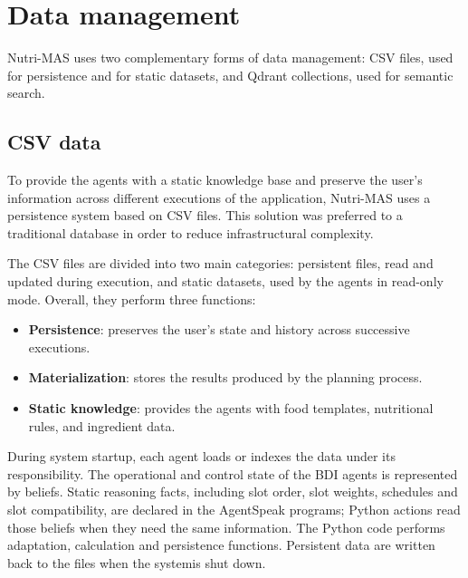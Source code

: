 \documentclass[12pt,a4paper]{article}
\begin{document}
\section{Data management}

Nutri-MAS uses two complementary forms of data management: CSV files,
used for persistence and for static datasets, and Qdrant collections,
used for semantic search.

\subsection{CSV data}

To provide the agents with a static knowledge base and preserve the
user's information across different executions of the application, Nutri-MAS
uses a persistence system based on CSV files. This solution was
preferred to a traditional database in order to reduce infrastructural
complexity.

The CSV files are divided into two main categories: persistent files, read
and updated during execution, and static datasets, used by the agents
in read-only mode. Overall, they perform three functions:

\begin{itemize}
    \item \textbf{Persistence}: preserves the user's state and history across successive executions.
    \item \textbf{Materialization}: stores the results produced by the planning process.
    \item \textbf{Static knowledge}: provides the agents with food templates,
    nutritional rules, and ingredient data.
\end{itemize}

During system startup, each agent loads or indexes the data under its responsibility. The
operational and control state of the BDI agents is represented by beliefs. Static reasoning
facts, including slot order, slot weights, schedules and slot compatibility, are declared in
the AgentSpeak programs; Python actions read those beliefs when they need the same information.
The Python code performs adaptation, calculation and persistence functions.
Persistent data are written back to the files when the systemis shut down.
\end{document}
